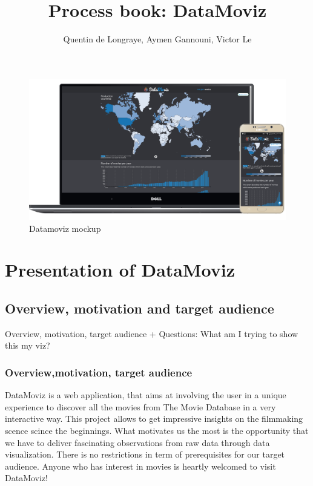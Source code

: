 \documentclass[a4paper,10pt]{article}
\begin{document}
\title{Process book: DataMoviz}
\author{Quentin de Longraye, Aymen Gannouni, Victor Le}

\maketitle

\begin{figure}[ht]
   \centering
   \includegraphics[width=1\linewidth]{../docs/mockup.png}
  \caption{Datamoviz mockup}
\end{figure}

\setlength{\parskip}{0.1\baselineskip}

\tableofcontents

\setlength{\parskip}{0.4\baselineskip}

\newpage

\section{Presentation of DataMoviz}

\subsection{Overview, motivation and target audience}
Overview, motivation, target audience
+ Questions: What am I trying to show this my viz?
\subsubsection*{Overview,motivation, target audience}
DataMoviz is a web application, that aims at involving the user in a unique experience to discover all the movies from The Movie Database in a very interactive way. This project allows to get impressive insights on the filmmaking scence scince the beginnings.
What motivates us the most is the opportunity that we have to deliver fascinating observations from raw data through data visualization.
There is no restrictions in term of prerequisites for our target audience. Anyone who has interest in movies is heartly welcomed to visit DataMoviz!
\end{document}
